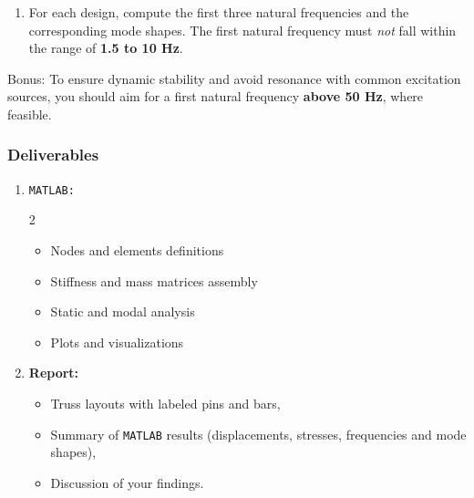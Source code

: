 \documentclass[12pt]{article}
\begin{document}
\begin{enumerate}
  \item[3.] For each design, compute the first three natural frequencies and the corresponding mode shapes. The first natural frequency must \emph{not} fall within the range of \textbf{1.5 to 10 Hz}.
\end{enumerate}

Bonus: To ensure dynamic stability and avoid resonance with common excitation sources, you should aim for a first natural frequency \textbf{above 50 Hz}, where feasible.

\subsubsection*{Deliverables}
\begin{enumerate}
  \item \texttt{MATLAB:}
        \begin{multicols}{2}
          \begin{itemize}
            \item Nodes and elements definitions
            \item Stiffness and mass matrices assembly
            \item Static and modal analysis
            \item Plots and visualizations
          \end{itemize}
        \end{multicols}


  \item \textbf{Report:}
        \begin{itemize}
          \item Truss layouts with labeled pins and bars,
          \item Summary of \texttt{MATLAB} results (displacements, stresses, frequencies and mode shapes),
          \item Discussion of your findings.
        \end{itemize}
\end{enumerate}
\end{document}
